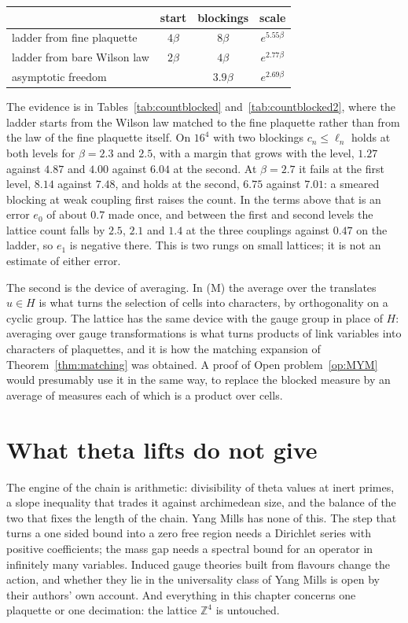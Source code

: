 \begin{center}
\small
\begin{tabular}{lccc}
\toprule
 & start & blockings & scale \\ \midrule
ladder from fine plaquette & $4\beta$ & $8\beta$ & $e^{5.55\beta}$ \\
ladder from bare Wilson law & $2\beta$ & $4\beta$ & $e^{2.77\beta}$ \\
asymptotic freedom & & $3.9\beta$ & $e^{2.69\beta}$ \\
\bottomrule
\end{tabular}
\end{center}

The evidence is in Tables~\ref{tab:countblocked} and~\ref{tab:countblocked2}, where the ladder starts from the Wilson law matched to the fine plaquette rather than from the law of the fine plaquette itself. On $16^4$ with two blockings $c_n\le\ell_n$ holds at both levels for $\beta=2.3$ and $2.5$, with a margin that grows with the level, $1.27$ against $4.87$ and $4.00$ against $6.04$ at the second. At $\beta=2.7$ it fails at the first level, $8.14$ against $7.48$, and holds at the second, $6.75$ against $7.01$: a smeared blocking at weak coupling first raises the count. In the terms above that is an error $e_0$ of about $0.7$ made once, and between the first and second levels the lattice count falls by $2.5$, $2.1$ and $1.4$ at the three couplings against $0.47$ on the ladder, so $e_1$ is negative there. This is two rungs on small lattices; it is not an estimate of either error.

The second is the device of averaging. In (M) the average over the translates $u\in H$ is what turns the selection of cells into characters, by orthogonality on a cyclic group. The lattice has the same device with the gauge group in place of $H$: averaging over gauge transformations is what turns products of link variables into characters of plaquettes, and it is how the matching expansion of Theorem~\ref{thm:matching} was obtained. A proof of Open problem~\ref{op:MYM} would presumably use it in the same way, to replace the blocked measure by an average of measures each of which is a product over cells.

\section{What theta lifts do not give}

The engine of the chain is arithmetic: divisibility of theta values at inert primes, a slope inequality that trades it against archimedean size, and the balance of the two that fixes the length of the chain. Yang Mills has none of this. The step that turns a one sided bound into a zero free region needs a Dirichlet series with positive coefficients; the mass gap needs a spectral bound for an operator in infinitely many variables. Induced gauge theories built from flavours change the action, and whether they lie in the universality class of Yang Mills is open by their authors' own account. And everything in this chapter concerns one plaquette or one decimation: the lattice $\mathbb Z^4$ is untouched.

